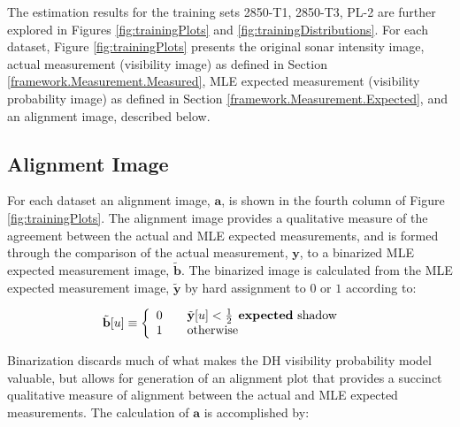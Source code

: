 The estimation results for the training sets 2850-T1, 2850-T3, PL-2 are further explored in Figures \ref{fig:trainingPlots} and \ref{fig:trainingDistributions}.
For each dataset, Figure \ref{fig:trainingPlots} presents the original sonar intensity image, actual measurement (visibility image) as defined in Section \ref{framework.Measurement.Measured}, MLE expected measurement (visibility probability image) as defined in Section \ref{framework.Measurement.Expected}, and an alignment image, described below.

\subsection{Alignment Image}
\label{rov.Summary.Alignment}

For each dataset an alignment image, $\mathbf{a}$, is shown in the fourth column of Figure \ref{fig:trainingPlots}.  
The alignment image provides a qualitative measure of the agreement between the actual and MLE expected measurements, and is formed through the comparison of the actual measurement, $\mathbf{y}$, to a binarized MLE expected measurement image, $\tilde{\mathbf{b}}$.
The binarized image is calculated from the MLE expected measurement image, $\tilde{\mathbf{y}}$ by hard assignment to $0$ or $1$ according to:

\begin{align}
\begin{split}
\tilde{\mathbf{b}}[u] &\equiv \left\{ 
  \begin{array}{l l}
    0 & \quad \tilde{\mathbf{y}}[u] < \frac{1}{2} \hspace{1ex} \text{\textbf{expected} shadow}\\
    1 & \quad \text{otherwise}
  \end{array} \right.
\end{split}
 \label{eq:binCalc}
\end{align}

\noindent Binarization discards much of what makes the DH visibility probability model valuable, but allows for generation of an alignment plot that provides a succinct qualitative measure of alignment between the actual and MLE expected measurements.
The calculation of $\mathbf{a}$ is accomplished by:

